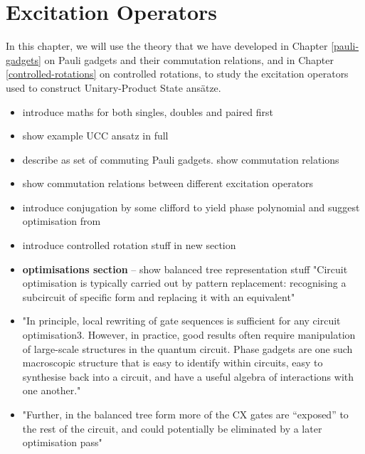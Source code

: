 \chapter{Excitation Operators}%
\label{excitation-operators}

In this chapter, we will use the theory that we have developed in Chapter \ref{pauli-gadgets} on Pauli gadgets and their commutation relations, and in Chapter \ref{controlled-rotations} on controlled rotations, to study the excitation operators used to construct Unitary-Product State ansätze.


\begin{itemize}[itemsep=-5pt]
    \item introduce maths for both singles, doubles and paired first
    \item show example UCC ansatz in full
    \item describe as set of commuting Pauli gadgets. show commutation relations
    \item show commutation relations between different excitation operators
    \item introduce conjugation by some clifford to yield phase polynomial and suggest optimisation from \cite{Cowtan2020}
    \item introduce controlled rotation stuff in new section
    \item \textbf{optimisations section} -- show balanced tree representation stuff "Circuit optimisation is typically carried out by pattern replacement: recognising a subcircuit of specific form and replacing it with an equivalent" \cite{Cowtan2019}
    \item "In principle, local rewriting of gate sequences is sufficient for any circuit optimisation3. However, in practice, good results often require manipulation of large-scale structures in the quantum circuit. Phase gadgets are one such macroscopic structure that is easy to identify within circuits, easy to synthesise back into a circuit, and have a useful algebra of interactions with one another." \cite{Cowtan2019}
    \item "Further, in the balanced tree form more of the CX gates are “exposed” to the rest of the circuit, and could potentially be eliminated by a later optimisation pass" \cite{Cowtan2019}
\end{itemize}

